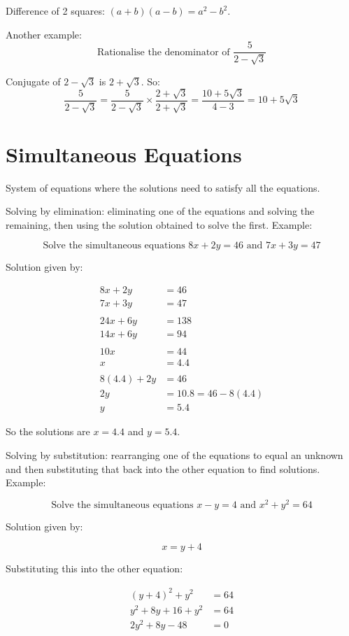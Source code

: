 \documentclass[a4paper]{report}
\begin{document}
Difference of 2 squares: \( (a + b)(a - b) = a^{2} - b^{2} \).

Another example: \[ \text{Rationalise the denominator of } \frac{5}{2 - \sqrt{3}} \]

Conjugate of \( 2 - \sqrt{3} \) is \( 2 + \sqrt{3} \). So: \[ \frac{5}{2 - \sqrt{3}} =
\frac{5}{2 - \sqrt{3}} \times \frac{ 2 + \sqrt{3}}{2 + \sqrt{3}} = \frac{10 + 5\sqrt{3}}{4 - 3} =
10 + 5\sqrt{3} \]

\section{Simultaneous Equations}

System of equations where the solutions need to satisfy all the equations.

Solving by elimination: eliminating one of the equations and solving the remaining, then using the
solution obtained to solve the first. Example:

\[ \text{Solve the simultaneous equations } 8x + 2y = 46 \text{ and } 7x + 3y = 47 \]

Solution given by:

\begin{align*}
	8x + 2y &= 46 \\
	7x + 3y &= 47 \\ \\
	24x + 6y &= 138 \\
	14x + 6y &= 94 \\ \\
	10x &= 44 \\
	x &= 4.4 \\ \\
	8(4.4) + 2y &= 46 \\
	2y &= 10.8 = 46 - 8(4.4) \\
	y &= 5.4
\end{align*}

So the solutions are \( x = 4.4 \) and \( y = 5.4 \).

Solving by substitution: rearranging one of the equations to equal an unknown
and then substituting that back into the other equation to find solutions.
Example:

\[ \text{Solve the simultaneous equations } x - y = 4 \text{ and }
x^2 + y^2 = 64 \]

Solution given by:

\[ x = y + 4 \]

Substituting this into the other equation:

\begin{align*}
	(y + 4)^2 + y^2 &= 64 \\
	y^2 + 8y + 16 + y^2 &= 64 \\
	2y^2 + 8y - 48 &= 0 \\
\end{align*}
\end{document}
